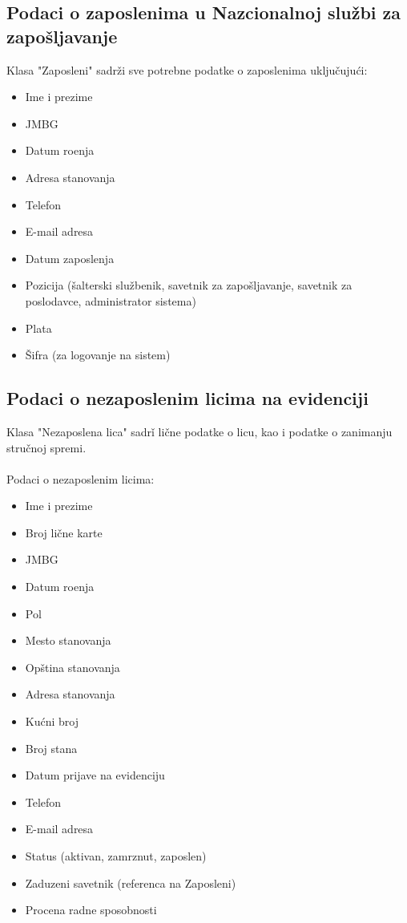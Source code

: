 \subsection{Podaci o zaposlenima u Nazcionalnoj slu\v zbi za zapo\v sljavanje}

Klasa "Zaposleni" sadr\v zi sve potrebne podatke o zaposlenima uklju\v cuju\' ci:
\begin{itemize}
	\item Ime i prezime
	\item JMBG
	\item Datum ro\dj enja
	\item Adresa stanovanja
	\item Telefon
	\item E-mail adresa
	\item Datum zaposlenja
	\item Pozicija (\v salterski slu\v zbenik, savetnik za zapo\v sljavanje, savetnik za poslodavce, administrator sistema)
	\item Plata
	\item \v Sifra (za logovanje na sistem)
\end{itemize}

\subsection{Podaci o nezaposlenim licima na evidenciji}

Klasa "Nezaposlena lica" sadr\v i li\v cne podatke o licu, kao i podatke o zanimanju stru\v cnoj spremi.
\\
\\ Podaci o nezaposlenim licima:
\begin{itemize}
	\item Ime i prezime
	\item Broj li\v cne karte
	\item JMBG
	\item Datum ro\dj enja
	\item Pol
	\item Mesto stanovanja
	\item Op\v stina stanovanja
	\item Adresa stanovanja
	\item Ku\' cni broj
	\item Broj stana 
	\item Datum prijave na evidenciju
	\item Telefon
	\item E-mail adresa
	\item Status (aktivan, zamrznut, zaposlen)
	\item Zaduzeni savetnik (referenca na Zaposleni)
	\item Procena radne sposobnosti
\end{itemize}


